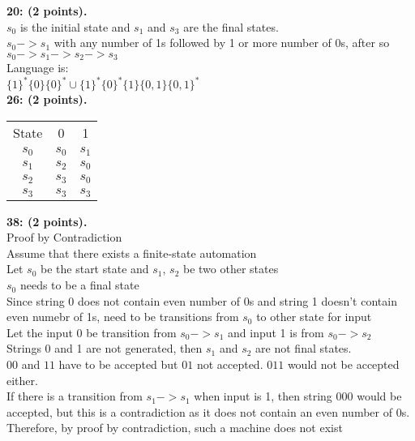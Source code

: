 \documentclass[12pt]{article}  %
\begin{document}
\noindent
{\bf 20: (2 points).} \\
$s_0$ is the initial state and $s_1$ and $s_3$ are the final states.\\
$s_0 -> s_1$ with any number of 1s followed by 1 or more number of 0s, after so $s_0 -> s_1 -> s_2 -> s_3$\\
Language is:\\
$\{1\}^*\{0\}\{0\}^*\cup\{1\}^*\{0\}^*\{1\}\{0,1\}\{0,1\}^*$\\


\noindent
{\bf 26: (2 points).} \\
\begin{center}
\begin{tabular}{ |c|c|c| } 
 \hline
 State & 0 & 1 \\ 
 $s_0$ & $s_0$ & $s_1$ \\ 
 $s_1$ & $s_2$ & $s_0$ \\ 
 $s_2$ & $s_3$ & $s_0$ \\ 
 $s_3$ & $s_3$ & $s_3$ \\ 
 \hline
\end{tabular}
\end{center}

\noindent
{\bf 38: (2 points).} \\
Proof by Contradiction\\
Assume that there exists a finite-state automation\\
Let $s_0$ be the start state and $s_1$, $s_2$ be two other states\\
$s_0$ needs to be a final state\\
Since string 0 does not contain even number of 0s and string 1 doesn't contain even numebr of 1s, need to be transitions from $s_0$ to other state for input\\
Let the input 0 be transition from $s_0 -> s_1$ and input 1 is from $s_0 -> s_2$\\
Strings 0 and 1 are not generated, then $s_1$ and $s_2$ are not final states.\\
$00$ and $11$ have to be accepted but $01$ not accepted. $011$ would not be accepted either.\\
If there is a transition from $s_1->s_1$ when input is 1, then string 000 would be accepted, but this is a contradiction as it does not contain an even number of 0s.\\
Therefore, by proof by contradiction, such a machine does not exist\\
\end{document}
